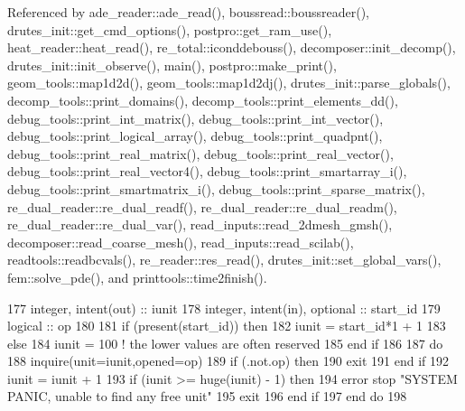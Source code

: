 Referenced by ade\+\_\+reader\+::ade\+\_\+read(), boussread\+::boussreader(), drutes\+\_\+init\+::get\+\_\+cmd\+\_\+options(), postpro\+::get\+\_\+ram\+\_\+use(), heat\+\_\+reader\+::heat\+\_\+read(), re\+\_\+total\+::iconddebouss(), decomposer\+::init\+\_\+decomp(), drutes\+\_\+init\+::init\+\_\+observe(), main(), postpro\+::make\+\_\+print(), geom\+\_\+tools\+::map1d2d(), geom\+\_\+tools\+::map1d2dj(), drutes\+\_\+init\+::parse\+\_\+globals(), decomp\+\_\+tools\+::print\+\_\+domains(), decomp\+\_\+tools\+::print\+\_\+elements\+\_\+dd(), debug\+\_\+tools\+::print\+\_\+int\+\_\+matrix(), debug\+\_\+tools\+::print\+\_\+int\+\_\+vector(), debug\+\_\+tools\+::print\+\_\+logical\+\_\+array(), debug\+\_\+tools\+::print\+\_\+quadpnt(), debug\+\_\+tools\+::print\+\_\+real\+\_\+matrix(), debug\+\_\+tools\+::print\+\_\+real\+\_\+vector(), debug\+\_\+tools\+::print\+\_\+real\+\_\+vector4(), debug\+\_\+tools\+::print\+\_\+smartarray\+\_\+i(), debug\+\_\+tools\+::print\+\_\+smartmatrix\+\_\+i(), debug\+\_\+tools\+::print\+\_\+sparse\+\_\+matrix(), re\+\_\+dual\+\_\+reader\+::re\+\_\+dual\+\_\+readf(), re\+\_\+dual\+\_\+reader\+::re\+\_\+dual\+\_\+readm(), re\+\_\+dual\+\_\+reader\+::re\+\_\+dual\+\_\+var(), read\+\_\+inputs\+::read\+\_\+2dmesh\+\_\+gmsh(), decomposer\+::read\+\_\+coarse\+\_\+mesh(), read\+\_\+inputs\+::read\+\_\+scilab(), readtools\+::readbcvals(), re\+\_\+reader\+::res\+\_\+read(), drutes\+\_\+init\+::set\+\_\+global\+\_\+vars(), fem\+::solve\+\_\+pde(), and printtools\+::time2finish().


\begin{DoxyCode}
177       \textcolor{keywordtype}{integer}, \textcolor{keywordtype}{intent(out)} :: iunit
178       \textcolor{keywordtype}{integer}, \textcolor{keywordtype}{intent(in)}, \textcolor{keywordtype}{optional} :: start\_id
179       \textcolor{keywordtype}{logical} :: op
180 
181       \textcolor{keywordflow}{if} (\textcolor{keyword}{present}(start\_id)) \textcolor{keywordflow}{then}
182         iunit = start\_id*1 + 1
183       \textcolor{keywordflow}{else}
184         iunit = 100 \textcolor{comment}{! the lower values are often reserved}
185 \textcolor{keywordflow}{      end if}
186 
187       \textcolor{keywordflow}{do}
188         \textcolor{keyword}{inquire}(unit=iunit,opened=op)
189         \textcolor{keywordflow}{if} (.not.op) \textcolor{keywordflow}{then}
190           \textcolor{keywordflow}{exit}
191 \textcolor{keywordflow}{        end if} 
192         iunit = iunit + 1  
193         \textcolor{keywordflow}{if} (iunit >= huge(iunit) - 1) \textcolor{keywordflow}{then}
194           error stop \textcolor{stringliteral}{"SYSTEM PANIC, unable to find any free unit"}
195           \textcolor{keywordflow}{exit}
196 \textcolor{keywordflow}{        end if}
197 \textcolor{keywordflow}{      end do}
198   
\end{DoxyCode}


